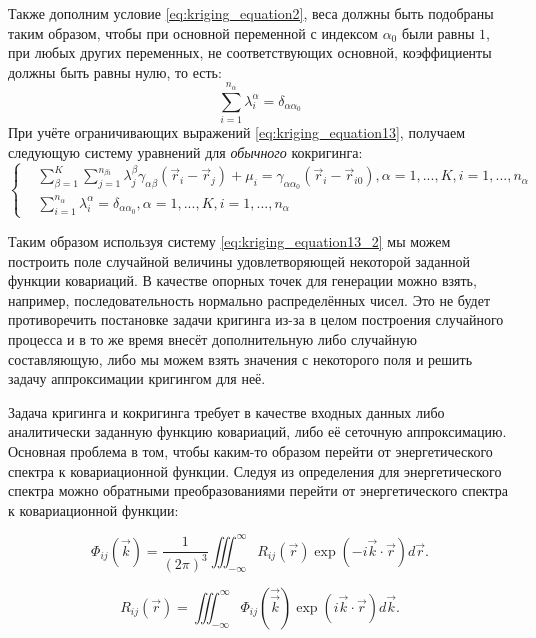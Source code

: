 Также дополним условие \eqref{eq:kriging_equation2}, веса должны быть подобраны таким образом, чтобы при основной переменной с индексом $\alpha_0$ были равны $1$, при любых других переменных, не соответствующих основной, коэффициенты должны быть равны нулю, то есть:
\begin{equation}
    \label{eq:kriging_equation13}
    \sum_{i = 1}^{n_\alpha} \lambda_i^{\alpha} = \delta_{\alpha \alpha_0}
\end{equation}
При учёте ограничивающих выражений \eqref{eq:kriging_equation13}, получаем следующую систему уравнений для \textit{обычного} кокригинга:
\[ 
\left\{
  \begin{array}{rl}
  \label{eq:kriging_equation13_2}
	&\sum_{\beta=1}^K \sum_{j = 1}^{n_{\beta i}} \lambda_j^{\beta} \gamma_{\alpha \beta}(\vec r_i - \vec r_j) + \mu_i = \gamma_{\alpha \alpha_0}(\vec r_i - \vec r_{i0}), \alpha = 1, ..., K, i = 1,...,n_\alpha \\
	&\sum_{i = 1}^{n_\alpha} \lambda_i^{\alpha} = \delta_{\alpha \alpha_0}, \alpha = 1, ..., K, i = 1,...,n_\alpha
  \end{array}
\right.
\]

Таким образом используя систему \ref{eq:kriging_equation13_2} мы можем построить поле случайной величины удовлетворяющей некоторой заданной функции ковариаций. В качестве опорных точек для генерации можно взять, например, последовательность нормально распределённых чисел. Это не будет противоречить постановке задачи кригинга из-за в целом построения случайного процесса и в то же время внесёт дополнительную либо случайную составляющую, либо мы можем взять значения с некоторого поля и решить задачу аппроксимации кригингом для неё. 

Задача кригинга и кокригинга требует в качестве входных данных либо аналитически заданную функцию ковариаций, либо её сеточную аппроксимацию. Основная проблема в том, чтобы каким-то образом перейти от энергетического спектра к ковариационной функции. Следуя из определения для энергетического спектра \cite{pope2000turbulent} можно обратными преобразованиями перейти от энергетического спектра к ковариационной функции:

\begin{equation}
    \label{eq:kriging_equation14}
    \Phi_{ij}(\vec{k}) = \frac{1}{(2 \pi)^3} \iiint_{-\infty}^{\infty} R_{ij}(\vec{r}) \exp{(- i \vec{k} \cdot \vec{r})} d\vec{r}.
\end{equation}

\begin{equation}
    \label{eq:kriging_equation14_2}
    R_{ij}(\vec{r}) = \iiint_{-\infty}^{\infty}  \Phi_{ij}(\vec{\vec k}) \exp{(i \vec k \cdot \vec r)} d \vec k.
\end{equation}

